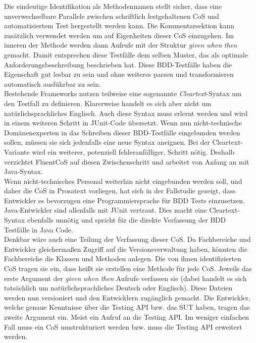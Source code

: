Die eindeutige Identifikation als Methodennamen stellt sicher, dass eine unverwechselbare Parallele zwischen schriftlich festgehaltenen CoS und automatisiertem Test hergestellt werden kann. Die Kommentarsektion kann zusätzlich verwendet werden um auf Eigenheiten dieser CoS einzugehen. Im inneren der Methode werden dann Aufrufe mit der Struktur \textit{given} \textit{when} \textit{then} gemacht. Damit entsprechen diese Testfälle dem selben Muster, das \citeauthor{north_official_2015} als optimale Anforderungsbeschreibung beschrieben hat. Diese BDD-Testfälle haben die Eigenschaft gut lesbar zu sein und ohne weiteres parsen und transformieren automatisch ausführbar zu sein.\\
Bestehende Frameworks nutzen teilweise eine sogenannte \textit{Cleartext}-Syntax um den Testfall zu definieren. Klarerweise handelt es sich aber nicht um natürlichsprachliches Englisch. Auch diese Syntax muss erlernt werden und wird in einem weiteren Schritt in JUnit-Code übersetzt. Wenn nun nicht-technische Domänenexperten in das Schreiben dieser BDD-Testfälle eingebunden werden sollen, müssen sie sich jedenfalls eine neue Syntax aneignen. Bei der Cleartext-Variante wird ein weiterer, potenziell fehleranfälliger, Schritt nötig. Deshalb verzichtet FluentCoS auf diesen Zwischenschritt und arbeitet von Anfang an mit Java-Syntax.\\
Wenn nicht-technisches Personal weiterhin nicht eingebunden werden soll, und daher die CoS in Prosatext vorliegen, hat sich in der Fallstudie gezeigt, dass Entwickler es bevorzugen eine Programmiersprache für \Gls{BDD} Tests einzusetzen. Java-Entwickler sind allenfalls mit JUnit vertraut. Dies macht eine Cleartext-Syntax ebenfalls unnötig und spricht für die direkte Verfassung der \Gls{BDD} Testfälle in Java Code.\\
Denkbar wäre auch eine Teilung der Verfassung dieser CoS. Da Fachbereiche und Entwickler gleichermaßen Zugriff auf die Versionsverwaltung haben, könnten die Fachbereiche die Klassen und Methoden anlegen. Die von ihnen identifizierten CoS tragen sie ein, dass heißt sie erstellen eine Methode für jede CoS. Jeweils das erste Argument der \textit{given} \textit{when} \textit{then} Aufrufe verfassen sie (dabei handelt es sich tatsächlich um natürlichsprachliches Deutsch oder Englisch). Diese Dateien werden nun versioniert und den Entwicklern zugänglich gemacht. Die Entwickler, welche genaue Kenntnisse über die Testing API bzw. das \Gls{SUT} haben, tragen das zweite Argument ein. Meist ein Aufruf an die Testing API. Im weniger einfachen Fall muss ein CoS umstrukturiert werden bzw. muss die Testing API erweitert werden.\\
